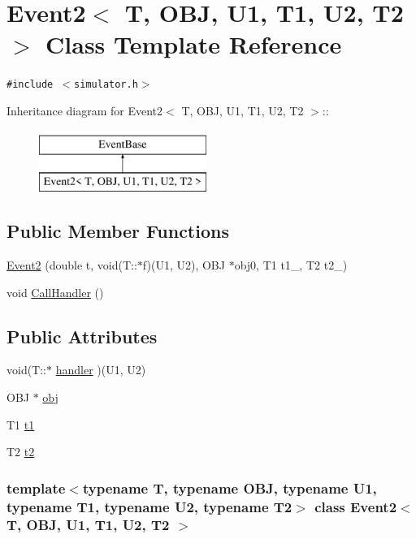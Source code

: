 \hypertarget{classEvent2}{
\section{Event2$<$ T, OBJ, U1, T1, U2, T2 $>$ Class Template Reference}
\label{classEvent2}
}
{\tt \#include $<$simulator.h$>$}

Inheritance diagram for Event2$<$ T, OBJ, U1, T1, U2, T2 $>$::\begin{figure}[H]
\begin{center}
\leavevmode
\includegraphics[height=2cm]{classEvent2}
\end{center}
\end{figure}
\subsection*{Public Member Functions}
\begin{CompactItemize}
\item 
\hyperlink{classEvent2_ba7c624909641184917f7a5603ab2ebe}{Event2} (double t, void(T::$\ast$f)(U1, U2), OBJ $\ast$obj0, T1 t1\_, T2 t2\_)
\item 
void \hyperlink{classEvent2_428b314837eee680fa435cad61944af3}{CallHandler} ()
\end{CompactItemize}
\subsection*{Public Attributes}
\begin{CompactItemize}
\item 
void(T::$\ast$ \hyperlink{classEvent2_166c37cb53b2969dac38fa79b0349768}{handler} )(U1, U2)
\item 
OBJ $\ast$ \hyperlink{classEvent2_e87200a757f09d76ae6aa5abd293f062}{obj}
\item 
T1 \hyperlink{classEvent2_b3e9b3c8ae4bff79e765e54a4947f371}{t1}
\item 
T2 \hyperlink{classEvent2_d921b4a0baa31fa2400fd022bf3b43e9}{t2}
\end{CompactItemize}
\subsubsection*{template$<$typename T, typename OBJ, typename U1, typename T1, typename U2, typename T2$>$ class Event2$<$ T, OBJ, U1, T1, U2, T2 $>$}




